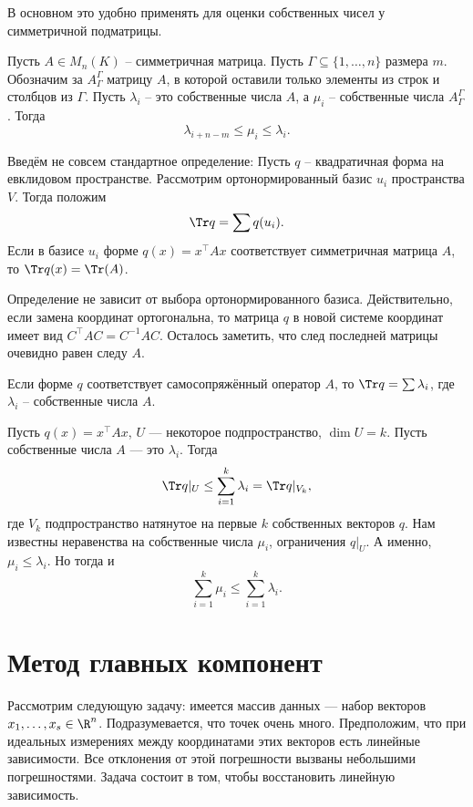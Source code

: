 В основном это удобно применять для оценки собственных чисел у симметричной подматрицы.

\crl Пусть $A\in M_n(K)$ -- симметричная матрица. Пусть $\Gamma \subseteq \{1,\dots, n\}$ размера $m$. Обозначим за $A^{\Gamma}_{\Gamma}$ матрицу $A$, в которой оставили только элементы из строк и столбцов из $\Gamma$. Пусть $\lambda_i$ -- это собственные числа $A$, а $\mu_i$ -- собственные числа $A^{\Gamma}_{\Gamma}$. Тогда
$$\lambda_{i+n-m}\leq \mu_i\leq \lambda_i.$$
\ecrl 


Введём не совсем стандартное определение:
\dfn
Пусть $q$ -- квадратичная форма на евклидовом пространстве. Рассмотрим ортонормированный базис $u_i$ пространства $V$. Тогда положим 
$$\Tr q= \sum q(u_i).$$ Если в базисе $u_i$ форме $q(x)=x^{\top} Ax $ соответствует симметричная матрица $A$, то $\Tr q(x)=\Tr(A)$.
\edfn

\rm Определение не зависит от выбора ортонормированного базиса. Действительно, если замена координат ортогональна, то матрица $q$ в новой системе координат имеет вид $C^{\top}AC=C^{-1}AC$. Осталось заметить, что след последней матрицы очевидно равен следу $A$.
\erm

\rm Если форме $q$ соответствует самосопряжённый оператор $A$, то $\Tr q=\sum \lambda_i$, где $\lambda_i$ -- собственные числа $A$.
\erm




\crl Пусть $q(x)=x^{\top} Ax$, $U$ --- некоторое подпространство, $\dim U=k$. Пусть собственные числа $A$ --- это $\lambda_i$. Тогда $$\Tr q|_U\leq \sum_{i=1}^k \lambda_i= \Tr q|_{V_k},$$
где $V_k$ подпространство натянутое на первые $k$ собственных векторов $q$.
\proof Нам известны неравенства на собственные числа $\mu_i$, ограничения $q|_U$. А именно, $\mu_i\leq \lambda_i$. Но тогда и $$\sum_{i=1}^k \mu_i \leq \sum_{i=1}^k \lambda_i.$$
\endproof
\ecrl 






\section{Метод главных компонент}

Рассмотрим следующую задачу: имеется массив данных --- набор векторов $x_1,\dots,x_s \in \R^n$. Подразумевается, что точек очень много. Предположим, что при идеальных измерениях между координатами этих векторов есть линейные зависимости. Все отклонения от этой погрешности вызваны небольшими погрешностями. Задача состоит в том, чтобы восстановить линейную зависимость. 


